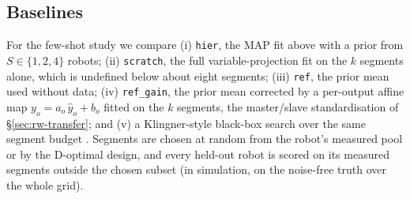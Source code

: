 \subsection{Baselines}\label{sec:baselines}

For the few-shot study we compare (i) \texttt{hier}, the MAP fit above
with a prior from \(S \in \{1, 2, 4\}\) robots; (ii)
\texttt{scratch}, the full variable-projection fit on the \(k\) segments
alone, which is undefined below about eight segments; (iii)
\texttt{ref}, the prior mean used without data; (iv) \texttt{ref\_gain},
the prior mean corrected by a per-output affine map
\(y_o = a_o\,\hat y_o + b_o\) fitted on the \(k\) segments, the
master/slave standardisation of §\ref{sec:rw-transfer}; and (v) a Klingner-style
black-box search \cite{klingner2014droplet} over the same segment
budget . Segments are chosen at random from the robot's
measured pool or by the D-optimal design, and every held-out robot is
scored on its measured segments outside the chosen subset (in
simulation, on the noise-free truth over the whole grid).
